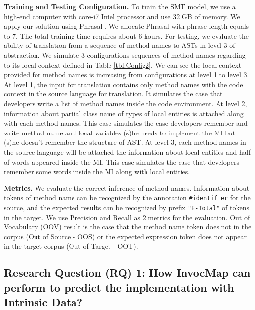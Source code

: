 \textbf{Training and Testing Configuration.} To train the SMT model, we use a high-end computer with core-i7 Intel processor and use 32 GB of memory. We apply our solution using Phrasal \cite{Green2014}. We allocate Phrasal with phrase length equals to 7. The total training time requires about 6 hours. For testing, we evaluate the ability of translation from a sequence of method names to ASTs in level 3 of abstraction. We simulate 3 configurations sequences of method names regarding to its local context defined in Table \ref{tbl:Config2}. We can see the local context provided for method names is increasing from configurations at level 1 to level 3. At level 1, the input for translation contains only method names with the code context in the source language for translation. It simulates the case that developers write a list of method names inside the code environment. At level 2, information about partial class name of types of local entities is attached along with each method names. This case simulates the case developers remember and write method name and local variables (s)he needs to implement the MI but (s)he doesn't remember the structure of AST. At level 3, each method names in the source language will be attached the information about local entities and half of words appeared inside the MI. This case simulates the case that developers remember some words inside the MI along with local entities. 


\textbf{Metrics.} We evaluate the correct inference of method names. Information about tokens of method name can be recognized by the annotation \texttt{\#identifier} for the source, and the expected results can be recognized by prefix \texttt{"E-Total"} of tokens in the target. We use Precision and Recall as 2 metrics for the evaluation. Out of Vocabulary (OOV) result is the case that the method name token does not in the corpus (Out of Source - OOS) or the expected expression token does not appear in the target corpus (Out of Target - OOT). 
 
\subsection{Research Question (RQ) 1: How InvocMap can perform to predict the implementation with Intrinsic Data?}


